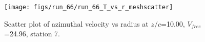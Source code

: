 \begin{figure}[H]
\centering
\texttt{[image: figs/run\_66/run\_66\_T\_vs\_r\_meshscatter]}
\caption{Scatter plot of azimuthal velocity vs radius at $z/c$=10.00, $V_{free}$=24.96, station 7.}
\label{fig:run_66_T_vs_r_meshscatter}
\end{figure}


